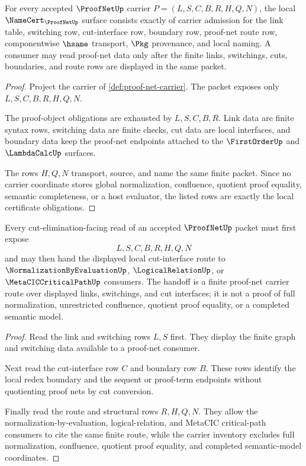 \begin{theorem}
\label{thm:proof-net-namecert-obligations}
For every accepted $\ProofNetUp$ carrier $P=(L,S,C,B,R,H,Q,N)$, the local $\NameCert_{\ProofNetUp}$ surface consists exactly of carrier admission for the link table, switching row, cut-interface row, boundary row, proof-net route row, componentwise $\hsame$ transport, $\Pkg$ provenance, and local naming. A consumer may read proof-net data only after the finite links, switchings, cuts, boundaries, and route rows are displayed in the same packet.
\end{theorem}
\begin{proof}
Project the carrier of \autoref{def:proof-net-carrier}. The packet exposes only $L,S,C,B,R,H,Q,N$.

The proof-object obligations are exhausted by $L,S,C,B,R$. Link data are finite syntax rows, switching data are finite checks, cut data are local interfaces, and boundary data keep the proof-net endpoints attached to the $\FirstOrderUp$ and $\LambdaCalcUp$ surfaces.

The rows $H,Q,N$ transport, source, and name the same finite packet. Since no carrier coordinate stores global normalization, confluence, quotient proof equality, semantic completeness, or a host evaluator, the listed rows are exactly the local certificate obligations.
\end{proof}

\begin{theorem}
\label{thm:proof-net-cut-elimination-route}
Every cut-elimination-facing read of an accepted $\ProofNetUp$ packet must first expose
$$
L,S,C,B,R,H,Q,N
$$
and may then hand the displayed local cut-interface route to $\NormalizationByEvaluationUp$, $\LogicalRelationUp$, or $\MetaCICCriticalPathUp$ consumers. The handoff is a finite proof-net carrier route over displayed links, switchings, and cut interfaces; it is not a proof of full normalization, unrestricted confluence, quotient proof equality, or a completed semantic model.
\end{theorem}
\begin{proof}
Read the link and switching rows $L,S$ first. They display the finite graph and switching data available to a proof-net consumer.

Next read the cut-interface row $C$ and boundary row $B$. These rows identify the local redex boundary and the sequent or proof-term endpoints without quotienting proof nets by cut conversion.

Finally read the route and structural rows $R,H,Q,N$. They allow the normalization-by-evaluation, logical-relation, and MetaCIC critical-path consumers to cite the same finite route, while the carrier inventory excludes full normalization, confluence, quotient proof equality, and completed semantic-model coordinates.
\end{proof}

